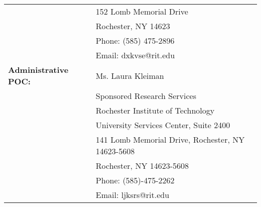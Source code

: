 \documentclass[12pt]{article}
\begin{document}
\begin{titlepage}
\begin{tabular}{ L{50mm} L{100mm} }
   & \vspace{-4mm} \normalsize 152 Lomb Memorial Drive \\
   & \vspace{-6mm} \normalsize Rochester, NY 14623 \\
   & \vspace{-8mm} \normalsize Phone: (585) 475-2896 \\
   & \vspace{-10mm} \normalsize Email: dxkvse@rit.edu \\

\vspace{-6mm}\normalsize \textbf{Administrative POC:} & \vspace{-6mm} \normalsize Ms. Laura Kleiman \\

   & \vspace{-9mm} \normalsize Sponsored Research Services  \\
   & \vspace{-11mm} \normalsize Rochester Institute of Technology  \\
   & \vspace{-13mm} \normalsize University Services Center, Suite 2400  \\
   & \vspace{-15mm} \normalsize 141 Lomb Memorial Drive, Rochester, NY 14623-5608   \\
   & \vspace{-17mm} \normalsize Rochester, NY 14623-5608  \\
   & \vspace{-19mm} \normalsize Phone: (585)-475-2262  \\
   & \vspace{-21mm} \normalsize Email: ljksrs@rit.edu  \\




\end{tabular}

 \end{titlepage}
\end{document}
